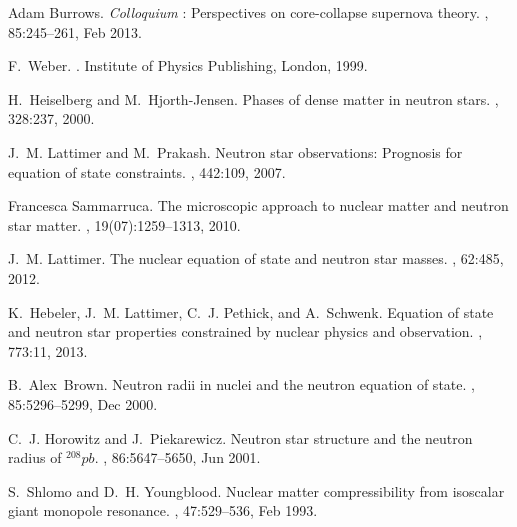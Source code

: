 \begin{thebibliography}{200}
Adam Burrows.
\newblock \textit{Colloquium} : Perspectives on core-collapse supernova theory.
, 85:245--261, Feb 2013.

F.~Weber.
.
\newblock Institute of Physics Publishing, London, 1999.

H.~Heiselberg and M.~Hjorth-Jensen.
\newblock Phases of dense matter in neutron stars.
, 328:237, 2000.

J.~M. Lattimer and M.~Prakash.
\newblock Neutron star observations: Prognosis for equation of state
  constraints.
, 442:109, 2007.

Francesca Sammarruca.
\newblock The microscopic approach to nuclear matter and neutron star matter.
, 19(07):1259--1313,
  2010.

J.~M. Lattimer.
\newblock The nuclear equation of state and neutron star masses.
, 62:485, 2012.

K.~Hebeler, J.~M. Lattimer, C.~J. Pethick, and A.~Schwenk.
\newblock Equation of state and neutron star properties constrained by nuclear
  physics and observation.
, 773:11, 2013.

B.~Alex~Brown.
\newblock Neutron radii in nuclei and the neutron equation of state.
, 85:5296--5299, Dec 2000.

C.~J. Horowitz and J.~Piekarewicz.
\newblock Neutron star structure and the neutron radius of $^{208}pb$.
, 86:5647--5650, Jun 2001.

S.~Shlomo and D.~H. Youngblood.
\newblock Nuclear matter compressibility from isoscalar giant monopole
  resonance.
, 47:529--536, Feb 1993.


\end{thebibliography}
